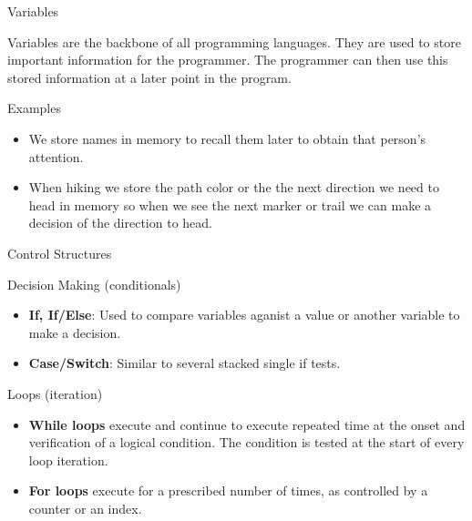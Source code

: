 \documentclass[10pt]{beamer}
\begin{document}
{\3%

\begin{frame}{Variables}{}
\begin{block}{}
Variables are the backbone of all programming languages.  They are used to store important information for the programmer.  The programmer can then use this stored information at a later point in the program.\end{block}
\begin{block}{Examples}
\begin{itemize}
    \item We store names in memory to recall them later to obtain that person's attention.
    \item When hiking we store the path color or the the next direction we need to head in memory so when we see the next marker or trail we can make a decision of the direction to head.
\end{itemize}
\end{block}
\end{frame}


\begin{frame}{Control Structures}{}
\begin{block}{Decision Making (conditionals)}
\begin{itemize}
    \item \textbf{If, If/Else}: Used to compare variables aganist a value or another variable to make a decision.
    \item \textbf{Case/Switch}: Similar to several stacked single if tests.
\end{itemize}

\end{block}
\begin{block}{Loops (iteration)}
    \begin{itemize}
    \item \textbf{While loops} execute and continue to execute repeated time at the onset and verification of a logical condition. The condition is tested at the start of every loop iteration.
    \item \textbf{For loops} execute for a prescribed number of times, as controlled by a counter or an index.
    \end{itemize}
\end{block}
\end{frame}

}
\end{document}
